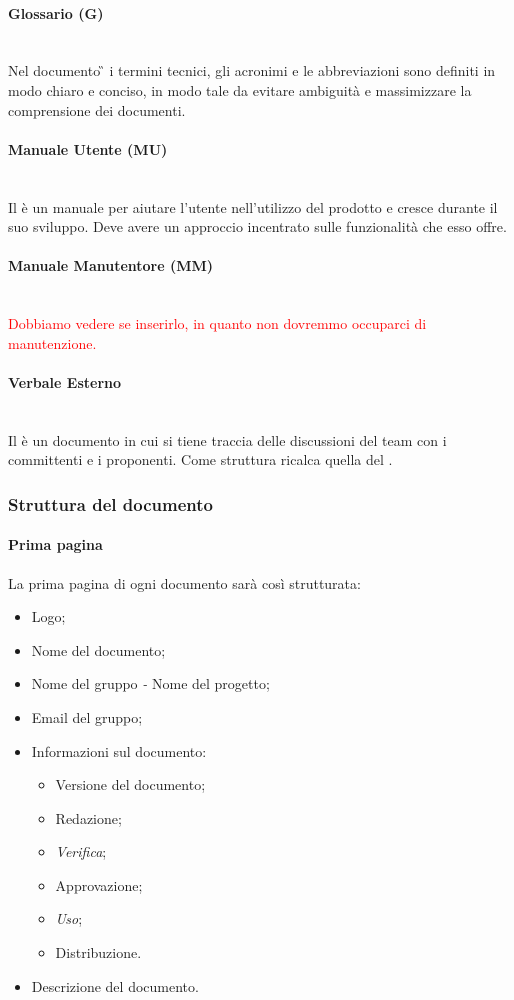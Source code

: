 \paragraph{Glossario (G)}
~\\Nel documento \G{} i termini tecnici, gli acronimi e le abbreviazioni sono definiti in modo chiaro e conciso, in modo tale da evitare ambiguità e massimizzare la comprensione dei documenti.
\paragraph{Manuale Utente (MU)}
~\\Il \MU{} è un manuale per aiutare l'utente nell'utilizzo del prodotto e cresce durante il suo sviluppo. Deve avere un approccio incentrato sulle funzionalità che esso offre.
\paragraph{Manuale Manutentore (MM)}
~\\\textcolor{red}{Dobbiamo vedere se inserirlo, in quanto non dovremmo occuparci di manutenzione.}
\paragraph{Verbale Esterno}
~\\Il \VE{} è un documento in cui si tiene traccia delle discussioni del team con i committenti e i proponenti. Come struttura ricalca quella del \VI.
\subsubsection{Struttura del documento}
\paragraph{Prima pagina}
La prima pagina di ogni documento sarà così strutturata:
\begin{itemize}
	\item Logo;
	\item Nome del documento;
	\item Nome del gruppo \emph{-} Nome del progetto;
	\item Email del gruppo;
	\item Informazioni sul documento:
	\begin{itemize}
		\item Versione del documento;
		\item Redazione;
		\item \emph{Verifica};
		\item Approvazione;
		\item \emph{Uso};
		\item Distribuzione.
	\end{itemize}
	\item Descrizione del documento.
\end{itemize}
